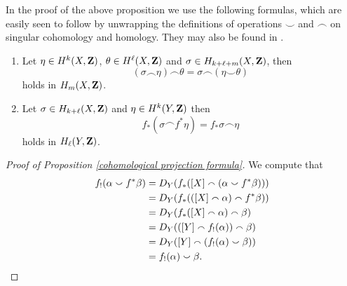 \begin{remark}
    In the proof of the above proposition we use the following formulas, which are easily seen to follow by unwrapping the definitions of operations $\smallsmile$ and $\smallfrown$ on singular cohomology and homology. They may also be found in \cite[\S VI, Theorem 5.2]{Bredon1993}.
    \begin{enumerate}[label = (\roman*)]
        \item{Let $\eta \in H^{k}(X, \mathbf Z)$, $\theta \in H^{\ell}(X, \mathbf Z)$ and $\sigma \in H_{k+\ell+m}(X, \mathbf Z)$, then 
        \[
            (\sigma \smallfrown \eta) \smallfrown \theta = 
            \sigma \smallfrown (\eta \smallsmile \theta)
        \]
        holds in $H_m(X, \mathbf Z)$.}
        \item{Let $\sigma \in H_{k + \ell}(X, \mathbf Z)$ and $\eta \in H^{k}(Y, \mathbf Z)$ then 
        \[
            f_*(\sigma \smallfrown f^*\eta) = f_*\sigma \smallfrown \eta
        \]
        holds in $H_\ell(Y, \mathbf Z)$.
        }
    \end{enumerate}
\end{remark}

\begin{proof}[Proof of Proposition \ref{cohomological projection formula}]
    We compute that
    \begin{align*}
        f_!(\alpha \smallsmile f^*\beta) &=
        D_Y(f_*([X] \smallfrown (\alpha \smallsmile f^*\beta))) \\
        &= D_Y(f_*(([X] \smallfrown \alpha) \smallfrown f^*\beta)) \\
        &= D_Y(f_*([X] \smallfrown \alpha) \smallfrown \beta) \\
        &= D_Y(([Y] \smallfrown f_!(\alpha)) \smallfrown \beta) \\
        &= D_Y([Y] \smallfrown (f_!(\alpha) \smallsmile \beta)) \\
        &= f_!(\alpha) \smallsmile \beta. \qedhere
    \end{align*}
\end{proof}

